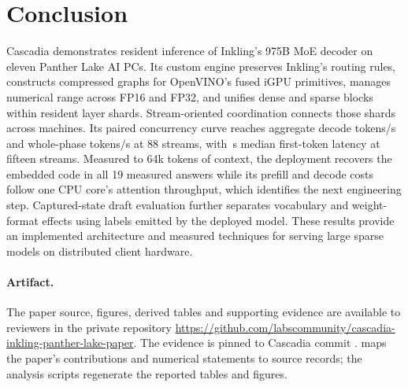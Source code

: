 \documentclass[11pt]{article}
\begin{document}
\section{Conclusion}
Cascadia demonstrates resident inference of Inkling's 975B MoE decoder on eleven Panther Lake AI PCs. Its custom engine preserves Inkling's routing rules, constructs compressed graphs for OpenVINO's fused iGPU primitives, manages numerical range across FP16 and FP32, and unifies dense and sparse blocks within resident layer shards. Stream-oriented coordination connects those shards across machines. Its paired concurrency curve reaches \SurveyDecode{} aggregate decode tokens/s and \SurveyPhase{} whole-phase tokens/s at 88 streams, with \SurveyTTFT{}\,s median first-token latency at fifteen streams. Measured to 64k tokens of context, the deployment recovers the embedded code in all 19 measured answers while its prefill and decode costs follow one CPU core's attention throughput, which identifies the next engineering step. Captured-state draft evaluation further separates vocabulary and weight-format effects using labels emitted by the deployed model. These results provide an implemented architecture and measured techniques for serving large sparse models on distributed client hardware.

\paragraph{Artifact.}
The paper source, figures, derived tables and supporting evidence are available to reviewers in the private repository \url{https://github.com/labscommunity/cascadia-inkling-panther-lake-paper}. The evidence is pinned to Cascadia commit .  maps the paper's contributions and numerical statements to source records; the analysis scripts regenerate the reported tables and figures.



\end{document}
